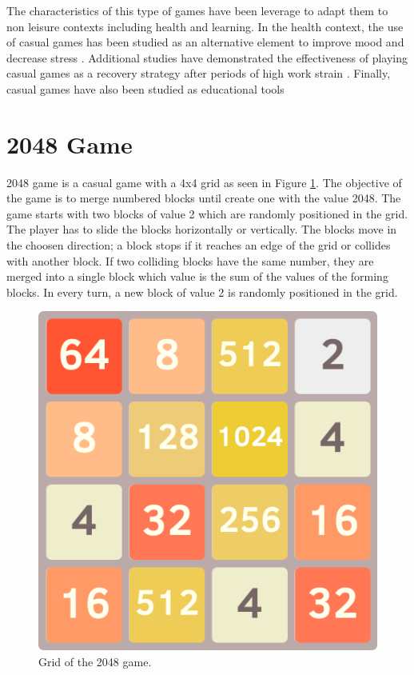 The characteristics of this type of games have been leverage to adapt them to non leisure contexts including health and learning. In the health context, the use of casual games has been studied as an alternative element to improve mood and decrease stress \citep{russoniello2009effectiveness}. Additional studies have demonstrated the effectiveness of playing casual games as a recovery strategy after periods of high work strain \citep{reinecke2009games}. Finally, casual games have also been studied as educational tools \citep{peirce2010personalised}

\section{2048 Game}
2048 game \citep{uberspot2017game} is a casual game with a 4x4 grid as seen in Figure \ref{fig:2048-grid}. The objective of the game is to merge numbered blocks until create one with the value 2048. The game starts with two blocks of value 2 which are randomly positioned in the grid. The player has to slide the blocks horizontally or vertically. The blocks move in the choosen direction; a block stops if it reaches an edge of the grid or collides with another block. If two colliding blocks have the same number, they are merged into a single block which value is the sum of the values of the forming blocks. In every turn, a new block of value 2 is randomly positioned in the grid.

\begin{figure}[htb]
    \vskip 5mm
        \begin{center}
            \includegraphics[scale=0.5]{./Figures/game_grid.png}
            \caption{Grid of the 2048 game.}
            \label{fig:2048-grid}
        \end{center}
    \vskip -5mm
\end{figure}

